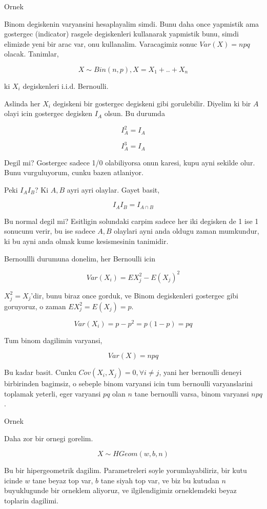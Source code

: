 \documentclass[12pt,fleqn]{article}\usepackage{../common}
\begin{document}
Ornek

Binom degiskenin varyansini hesaplayalim simdi. Bunu daha once yapmistik
ama gostergec (indicator) rasgele degiskenleri kullanarak yapmistik bunu,
simdi elimizde yeni bir arac var, onu kullanalim. Varacagimiz sonuc 
$Var(X) = npq$ olacak. Tanimlar,

$$ X \sim Bin(n,p), X = X_1+..+X_n $$

ki $X_i$ degiskenleri i.i.d. Bernoulli. 

Aslinda her $X_i$ degiskeni bir gostergec degiskeni gibi
gorulebilir. Diyelim ki bir $A$ olayi icin gostergec degisken $I_A$
olsun. Bu durumda

$$ I_A^2 = I_A $$

$$ I_A^3 = I_A $$

Degil mi? Gostergec sadece 1/0 olabiliyorsa onun karesi, kupu ayni sekilde
olur. Bunu vurguluyorum, cunku bazen atlaniyor. 

Peki $I_AI_B$? Ki $A,B$ ayri ayri olaylar. Gayet basit, 

$$ I_AI_B = I_{A \cap B} $$

Bu normal degil mi? Esitligin solundaki carpim sadece her iki degisken de 1
ise 1 sonucunu verir, bu ise sadece $A,B$ olaylari ayni anda oldugu zaman
mumkundur, ki bu ayni anda olmak kume kesismesinin tanimidir. 

Bernoullli durumuna donelim, her Bernoulli icin

$$ Var(X_i) = EX_j^2 - E(X_j)^2 $$

$X_j^2 = X_j$'dir, bunu biraz once gorduk, ve Binom degiskenleri gostergec
gibi goruyoruz, o zaman $EX_j^2 = E(X_j) = p$. 

$$ Var(X_i) = p - p^2 = p(1-p) = pq$$

Tum binom dagilimin varyansi, 

$$ Var(X) = npq $$

Bu kadar basit. Cunku $Cov(X_i,X_j)=0,\forall i \ne j$, yani her bernoulli
deneyi birbirinden bagimsiz, o sebeple binom varyansi icin tum bernoulli
varyanslarini toplamak yeterli, eger varyansi $pq$ olan $n$ tane bernoulli
varsa, binom varyansi $npq$. 

Ornek

Daha zor bir ornegi gorelim. 

$$ X \sim HGeom(w,b,n) $$

Bu bir hipergeometrik dagilim. Parametreleri soyle yorumlayabiliriz, bir
kutu icinde $w$ tane beyaz top var, $b$ tane siyah top var, ve biz bu
kutudan $n$ buyuklugunde bir orneklem aliyoruz, ve ilgilendigimiz
orneklemdeki beyaz toplarin dagilimi. 
\end{document}
